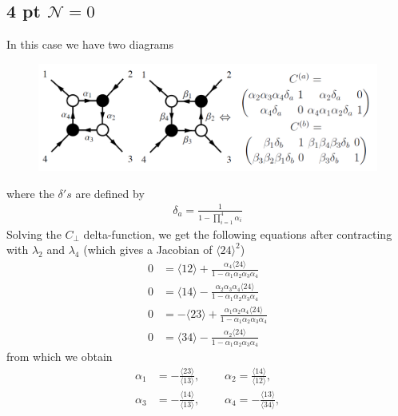 \documentclass[letter,11pt]{article}
\newcommand{\ab}[1]{\langle #1 \rangle}
\begin{document}
\subsection{ 4 pt $\mathcal{N}=0$}
In this case we have two diagrams
\begin{figure}[H]
	\centering
	\includegraphics[width=0.7\linewidth]{YM4pt}
	\caption{}
	\label{fig:jexample}
\end{figure}
where the $\delta's$ are defined by
\begin{equation}
	\begin{aligned}
		\delta_a=\frac{1}{1-\prod_{i=1}^{4}\alpha_i}
	\end{aligned}
\end{equation}
Solving the $C_\perp$ delta-function, we get the following equations after contracting with $\lambda_2$ and $\lambda_4$ (which gives a Jacobian of $\ab{24}^2$)
\begin{equation}
	\begin{aligned} \label{eq:1}
		           0&=   
		\langle 1 2 \rangle + \frac{ \alpha_{4} \langle 2 4\rangle
		}{1 - \alpha_{1} \alpha_{2} \alpha_{3} \alpha_{4}}
		\\
 0&=   
\langle 1 4\rangle - \frac{\alpha_{2} \alpha_{3} \alpha_{4} \langle 2 4\rangle
}{1 - \alpha_{1} \alpha_{2} \alpha_{3} \alpha_{4}}
\\
 0&=   
-\langle 23\rangle + \frac{\alpha_{1} \alpha_{2} \alpha_{4} \langle 2 4\rangle
}{1 - \alpha_{1} \alpha_{2} \alpha_{3} \alpha_{4}}
\\
	 0&=   
	\langle 3 4\rangle - \frac{\alpha_{2}  \langle 2 4\rangle
	}{1 - \alpha_{1} \alpha_{2} \alpha_{3} \alpha_{4}}
	\end{aligned}
\end{equation}
from which we obtain
\begin{equation}
	\begin{aligned} \label{eq:1}
	\alpha_1&=-\frac{\langle 23 \rangle}{\langle 13\rangle},~~~~~~~~~~\alpha_2=\frac{\langle 14 \rangle}{\langle 12\rangle},\\
	\alpha_3&=-\frac{\langle 14 \rangle}{\langle 13\rangle},~~~~~~~~~~	\alpha_4=-\frac{\langle 13 \rangle}{\langle 34\rangle},
	\end{aligned}
\end{equation}
\end{document}
